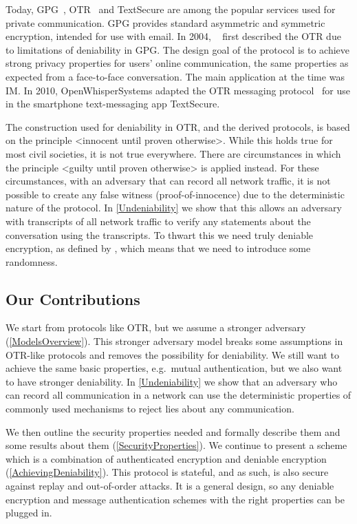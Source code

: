Today, \ac{GPG}~\cite{gpg}, \ac{OTR}~\cite{otr2004} and Text\-Secure 
\cite{textsecure} are among the popular services used for private 
communication.
\ac{GPG} provides standard asymmetric and symmetric encryption, intended for 
use with email.
In 2004, \citeauthor{otr2004}~\cite{otr2004} first described the \ac{OTR} due 
to limitations of deniability in \ac{GPG}.
The design goal of the protocol is to achieve strong privacy properties for 
users' online communication, the same properties as expected from 
a face-to-face conversation.
The main application at the time was \ac{IM}.
In 2010, OpenWhisperSystems adapted the \ac{OTR} messaging 
protocol~\cite{frosch2014secure} for use in the smartphone text-messaging app 
TextSecure.

The construction used for deniability in \ac{OTR}, and the derived protocols, 
is based on the principle <innocent until proven otherwise>.
While this holds true for most civil societies, it is not true everywhere.
There are circumstances in which the principle <guilty until proven otherwise> 
is applied instead.
For these circumstances, with an adversary that can record all network traffic, 
it is not possible to create any false witness (proof-of-innocence) due to the 
deterministic nature of the protocol.
In \cref{Undeniability} we show that this allows an adversary with 
transcripts of all network traffic to verify any statements about the 
conversation using the transcripts.
To thwart this we need truly deniable encryption, as defined by 
\citet{DeniableEncryption}, which means that we need to introduce some 
randomness.

\subsection{Our Contributions}
\label{Contributions}

We start from protocols like \ac{OTR}, but we assume a stronger adversary 
(\cref{ModelsOverview}).
This stronger adversary model breaks some assumptions in \ac{OTR}-like 
protocols and removes the possibility for deniability.
We still want to achieve the same basic properties, e.g.~mutual authentication, 
but we also want to have stronger deniability.
In \cref{Undeniability} we show that an adversary who can record all 
communication in a network can use the deterministic properties of commonly 
used mechanisms to reject lies about any communication.

We then outline the security properties needed and formally describe them and 
some results about them (\cref{SecurityProperties}).
We continue to present a scheme which is a combination of authenticated 
encryption and deniable encryption (\cref{AchievingDeniability}).
This protocol is stateful, and as such, is also secure against replay and 
out-of-order attacks.
It is a general design, so any deniable encryption and message authentication 
schemes with the right properties can be plugged in.

